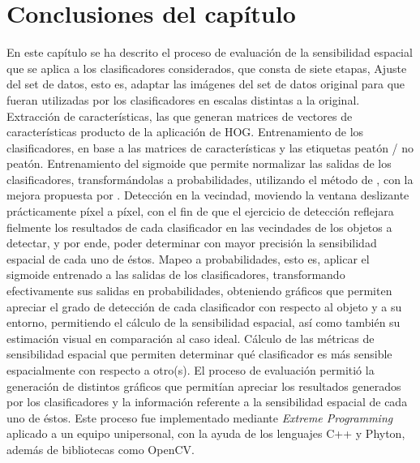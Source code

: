 \section{Conclusiones del capítulo}

En este capítulo se ha descrito el proceso de evaluación de la sensibilidad espacial que se aplica a los clasificadores considerados, que consta de siete etapas, Ajuste del set de datos, esto es, adaptar las imágenes del set de datos original para que fueran utilizadas por los clasificadores en escalas distintas a la original. Extracción de características, las que generan matrices de vectores de características producto de la aplicación de HOG. Entrenamiento de los clasificadores, en base a las matrices de características y las etiquetas peatón / no peatón. Entrenamiento del sigmoide que permite normalizar las salidas de los clasificadores, transformándolas a probabilidades, utilizando el método de \cite{Platt1999}, con la mejora propuesta por \cite{Lin2000}. Detección en la vecindad, moviendo la ventana deslizante prácticamente píxel a píxel, con el fin de que el ejercicio de detección reflejara fielmente los resultados de cada clasificador en las vecindades de los objetos a detectar, y por ende, poder determinar con mayor precisión la sensibilidad espacial de cada uno de éstos. Mapeo a probabilidades, esto es, aplicar el sigmoide entrenado a las salidas de los clasificadores, transformando efectivamente sus salidas en probabilidades, obteniendo gráficos que permiten apreciar el grado de detección de cada clasificador con respecto al objeto y a su entorno, permitiendo el cálculo de la sensibilidad espacial, así como también su estimación visual en comparación al caso ideal. Cálculo de las métricas de sensibilidad espacial que permiten determinar qué clasificador es más sensible espacialmente con respecto a otro(s). 
El proceso de evaluación permitió la generación de distintos gráficos que permitían apreciar los resultados generados por los clasificadores y la información referente a la sensibilidad espacial de cada uno de éstos. Este proceso fue implementado mediante \textit{Extreme Programming} aplicado a un equipo unipersonal, con la ayuda de los lenguajes C++ y Phyton, además de bibliotecas como OpenCV.
